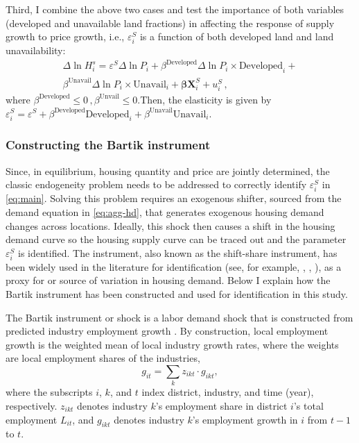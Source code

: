 \documentclass[
  12pt,
]{article}
\begin{document}
Third, I combine the above two cases and test the importance of both variables (developed and unavailable land fractions) in affecting the response of supply growth to price growth, i.e., \(\varepsilon^S_i\) is a function of both developed land and land unavailability: \begin{equation}
\begin{split}
\Delta\ln H_i^s = \varepsilon^S\Delta\ln P_i + \beta^{\text{Developed}} \Delta \ln P_i\times\text{Developed}_i + \\
\beta^{\text{Unavail}} \Delta \ln P_i\times\text{Unavail}_i + \boldsymbol{\beta}\boldsymbol{X}_i^S + u^S_i\,, \label{eq:case-4}
\end{split}
\end{equation} where \(\beta^{\text{Developed}} \le 0\,, \beta^{\text{Unvail}}\le0\).Then, the elasticity is given by \(\varepsilon^S_i = \varepsilon^S + \beta^{\text{Developed}}\text{Developed}_i + \beta^{\text{Unavail}}\text{Unavail}_i\).

\subsubsection{Constructing the Bartik instrument}\label{constructing-the-bartik-instrument}

Since, in equilibrium, housing quantity and price are jointly determined, the classic endogeneity problem needs to be addressed to correctly identify \(\varepsilon^S_i\) in \eqref{eq:main}. Solving this problem requires an exogenous shifter, sourced from the demand equation in \eqref{eq:agg-hd}, that generates exogenous housing demand changes across locations. Ideally, this shock then causes a shift in the housing demand curve so the housing supply curve can be traced out and the parameter \(\varepsilon^S_i\) is identified. The \citet{bartik1991} instrument, also known as the shift-share instrument, has been widely used in the literature for identification (see, for example, \citet{saiz2010}, \citet{hilber-vermeulen2016}, \citet{baumsnow-han2019}), as a proxy for or source of variation in housing demand. Below I explain how the Bartik instrument has been constructed and used for identification in this study.

The Bartik instrument or shock is a labor demand shock that is constructed from predicted industry employment growth \citep{gpss2020, blanchard-katz1992, bartik1991}. By construction, local employment growth is the weighted mean of local industry growth rates, where the weights are local employment shares of the industries, \begin{equation}
 g_{it} = \sum_k z_{ikt}\cdot g_{ikt},
\end{equation}where the subscripts \(i\), \(k\), and \(t\) index district, industry, and time (year), respectively. \(z_{ikt}\) denotes industry \(k\)'s employment share in district \(i\)'s total employment \(L_{it}\), and \(g_{ikt}\) denotes industry \(k\)'s employment growth in \(i\) from \(t-1\) to \(t\).
\end{document}

